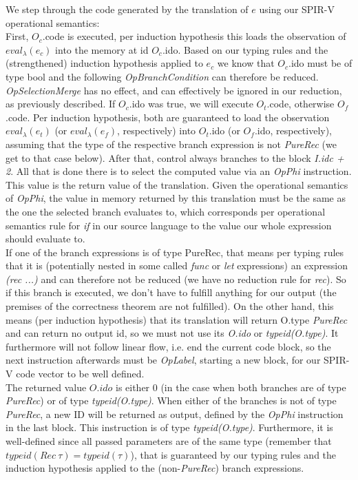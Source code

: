 \documentclass[letterpaper,12pt]{article}
\begin{document}
We step through the code generated by the translation of $e$ using
our SPIR-V operational semantics: \\
First, $O_c$.code is executed, per induction hypothesis
this loads the observation of $eval_\lambda(e_c)$ into the memory
at id $O_c$.ido. Based on our typing rules and the (strengthened) induction hypothesis
applied to $e_c$ we know that $O_c$.ido must be of type bool and the
following \textit{OpBranchCondition} can therefore be reduced.
\textit{OpSelectionMerge} has no effect, and can effectively be ignored
in our reduction, as previously described.
If $O_c$.ido was true, we will execute $O_t$.code, otherwise
$O_f$.code. Per induction hypothesis, both are guaranteed to load
the observation $eval_\lambda(e_t)$ (or $eval_\lambda(e_f)$, respectively)
into $O_t$.ido (or $O_f$.ido, respectively), assuming that the type of the
respective branch expression is not \textit{PureRec} (we get to that case below).
After that, control always branches to the block \textit{I.idc + 2}.
All that is done there is to select the computed value via an \textit{OpPhi}
instruction. This value is the return value of the translation. Given
the operational semantics of \textit{OpPhi}, the value in memory
returned by this translation must be the same as the one the selected
branch evaluates to, which corresponds per operational semantics rule
for \textit{if} in our source language to the value our whole expression
should evaluate to. \\

If one of the branch expressions is of type PureRec, that means per
typing rules that it is (potentially nested in some called \textit{func}
or \textit{let} expressions) an expression \textit{(rec ...)}
and can therefore not be reduced (we have no reduction rule for \textit{rec}).
So if this branch is executed, we don't have to fulfill anything
for our output (the premises of the correctness theorem are not fulfilled).
On the other hand, this means (per induction hypothesis)
that its translation will return O.type \textit{PureRec} and can return
no output id, so we must not use its \textit{O.ido} or \textit{typeid(O.type)}.
It furthermore will not follow linear flow, i.e. end the current code block,
so the next instruction afterwards must be \textit{OpLabel}, starting
a new block, for our SPIR-V code vector to be well defined. \\

The returned value $O.ido$ is either $0$ (in the case
when both branches are of type \textit{PureRec}) or of type \textit{typeid(O.type)}.
When either of the branches is not of type \textit{PureRec}, a new
ID will be returned as output, defined by the \textit{OpPhi} instruction
in the last block. This instruction is of type \textit{typeid(O.type)}.
Furthermore, it is well-defined since all passed parameters are
of the same type (remember that $typeid(Rec\: \tau) = typeid(\tau)$),
that is guaranteed by our typing rules and the induction hypothesis
applied to the (non-\textit{PureRec}) branch expressions.
\end{document}
